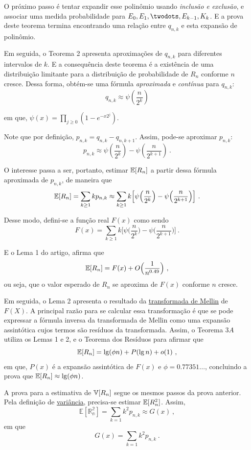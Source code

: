 O próximo passo é tentar expandir esse polinômio usando \textit{inclusão e exclusão}, e associar uma medida 
probabilidade para $E_0, E_1, \twodots, E_{k-1}, K_k$. E a prova deste teorema termina encontrando uma relação entre 
$q_{n,k}$ e esta expansão de polinômio.

Em seguida, o Teorema 2 apresenta aproximações de $q_{n,k}$ para diferentes intervalos de $k$. E a consequência deste 
teorema é a existência de uma distribuição limitante para a distribuição de probabilidade de $R_n$ conforme $n$ cresce. 
Dessa forma, obtém-se uma fórmula \textit{aproximada} e \textit{contínua} para $q_{n,k}$:
\[ q_{n,k} \approx \psi(\frac{n}{2^k}) \]

em que, $\psi(x) = \prod_{j \geq 0} (1 - e^{-x2^j})$.

Note que por definição, $p_{n,k} = q_{n,k} - q_{n,k+1}$. Assim, pode-se aproximar $p_{n,k}$:
\[ p_{n,k} \approx \psi(\frac{n}{2^k}) - \psi(\frac{n}{2^{k+1}}) \ . \]

O interesse passa a ser, portanto, estimar $\mathbb{E}[R_n]$ a partir dessa fórmula aproximada de $p_{n,k}$, de maneira 
que 
\[ \mathbb{E}[R_n] = \sum_{k \geq 1} k p_{n,k} \approx \sum_{k \geq 1} k \Big[ \psi \Big( \frac{n}{2^k} \Big) - \psi 
  \Big( \frac{n}{2^{k+1}} \Big) \Big] \ . \]

Desse modo, defini-se a função real $F(x)$ como sendo
\[ F(x) =  \sum_{k \geq 1} k \Big[ \psi \Big( \frac{n}{2^k} \Big) - \psi \Big( \frac{n}{2^{k+1}} \Big) \Big] \ . \]

E o Lema 1 do artigo, afirma que 
\[ \mathbb{E}[R_n] = F(x) + O \Big( \frac{1}{n^{0.49}} \Big) \ , \]
ou seja, que o valor esperado de $R_n$ se aproxima de $F(x)$ conforme $n$ cresce.

Em seguida, o Lema 2 apresenta o resultado da \hyperref[ap:mellin]{transformada de Mellin} de $F(X)$. A principal razão 
para se calcular essa transformação é que se pode expressar a fórmula inversa da transformada de Mellin como uma 
expansão assintótica cujos termos são resíduos da transformada. Assim, o Teorema $3A$ utiliza os Lemas 1 e 2, e o 
Teorema dos Resíduos para afirmar que 
\[ \Ebb[R_n] = \lg (\phi n) + P(\lg n) + o(1) \ , \]
em que, $P(x)$ é a expansão assintótica de $F(x)$ e $\phi = 0.77351\dots$, concluindo a prova que 
$\mathbb{E}[R_n] \approx \lg (\phi n)$.

A prova para a estimativa de $\mathbb{V}[R_n]$ segue os mesmos passos da prova anterior. Pela definição de 
\hyperref[ap:variance]{variância}, precisa-se estimar $\mathbb{E}[R_n ^ 2]$. Assim, 
\[ \mathbb{E[R_n ^2]} = \sum_{k=1} k^2 p_{n,k} \approx G(x) \ , \]
em que
\[ G(x) = \sum_{k=1} k^2 p_{n,k} \ . \]

